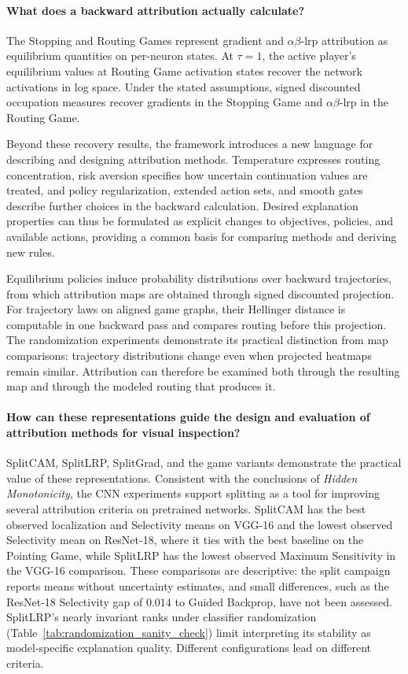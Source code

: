 \paragraph{What does a backward attribution actually calculate?}
The Stopping and Routing Games represent gradient and $\alpha\beta$-\ac{lrp} attribution as equilibrium quantities on per-neuron states. At $\tau=1$, the active player's equilibrium values at Routing Game activation states recover the network activations in log space. Under the stated assumptions, signed discounted occupation measures recover gradients in the Stopping Game and $\alpha\beta$-\ac{lrp} in the Routing Game.

Beyond these recovery results, the framework introduces a new language for describing and designing attribution methods. Temperature expresses routing concentration, risk aversion specifies how uncertain continuation values are treated, and policy regularization, extended action sets, and smooth gates describe further choices in the backward calculation. Desired explanation properties can thus be formulated as explicit changes to objectives, policies, and available actions, providing a common basis for comparing methods and deriving new rules.

Equilibrium policies induce probability distributions over backward trajectories, from which attribution maps are obtained through signed discounted projection. For trajectory laws on aligned game graphs, their Hellinger distance is computable in one backward pass and compares routing before this projection. The randomization experiments demonstrate its practical distinction from map comparisons: trajectory distributions change even when projected heatmaps remain similar. Attribution can therefore be examined both through the resulting map and through the modeled routing that produces it.

\paragraph{How can these representations guide the design and evaluation of attribution methods for visual inspection?}
SplitCAM, SplitLRP, SplitGrad, and the game variants demonstrate the practical value of these representations. Consistent with the conclusions of \emph{Hidden Monotonicity}, the CNN experiments support splitting as a tool for improving several attribution criteria on pretrained networks. SplitCAM has the best observed localization and Selectivity means on VGG-16 and the lowest observed Selectivity mean on ResNet-18, where it ties with the best baseline on the Pointing Game, while SplitLRP has the lowest observed Maximum Sensitivity in the VGG-16 comparison. These comparisons are descriptive: the split campaign reports means without uncertainty estimates, and small differences, such as the ResNet-18 Selectivity gap of $0.014$ to Guided Backprop, have not been assessed. SplitLRP's nearly invariant ranks under classifier randomization (Table~\ref{tab:randomization_sanity_check}) limit interpreting its stability as model-specific explanation quality. Different configurations lead on different criteria.

